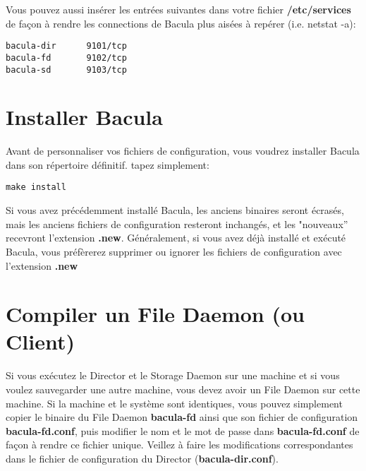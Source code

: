 {{{{{{{Vous pouvez aussi ins\'erer les entr\'ees suivantes dans votre fichier {\bf
/etc/services} de fa\c{c}on \`a rendre les connections de Bacula plus
ais\'ees \`a rep\'erer (i.e. netstat -a): 

\footnotesize
\begin{verbatim}
bacula-dir      9101/tcp
bacula-fd       9102/tcp
bacula-sd       9103/tcp
\end{verbatim}
\normalsize

\section{Installer Bacula}

Avant de personnaliser vos fichiers de configuration, vous voudrez installer
Bacula dans son r\'epertoire d\'efinitif. tapez simplement: 

\footnotesize
\begin{verbatim}
make install
\end{verbatim}
\normalsize

Si vous avez pr\'ec\'edemment install\'e Bacula, les anciens binaires seront
\'ecras\'es, mais les anciens fichiers de configuration resteront inchang\'es,
et les "nouveaux'' recevront l'extension {\bf .new}. G\'en\'eralement, si
vous avez d\'ej\`a install\'e et ex\'ecut\'e Bacula, vous pr\'ef\`ererez
supprimer ou ignorer les fichiers de configuration avec l'extension {\bf .new}


\section{Compiler un File Daemon (ou Client)}

Si vous ex\'ecutez le Director et le Storage Daemon sur une machine et si vous
voulez sauvegarder une autre machine, vous devez avoir un File Daemon sur
cette machine. Si la machine et le syst\`eme sont identiques, vous pouvez
simplement copier le binaire du File Daemon {\bf bacula-fd} ainsi que son
fichier de configuration {\bf bacula-fd.conf}, puis modifier le nom et le mot
de passe dans {\bf bacula-fd.conf} de fa\c{c}on \`a rendre ce fichier unique.
Veillez \`a faire les modifications correspondantes dans le fichier de
configuration du Director ({\bf bacula-dir.conf}). 

}}}}}}}
